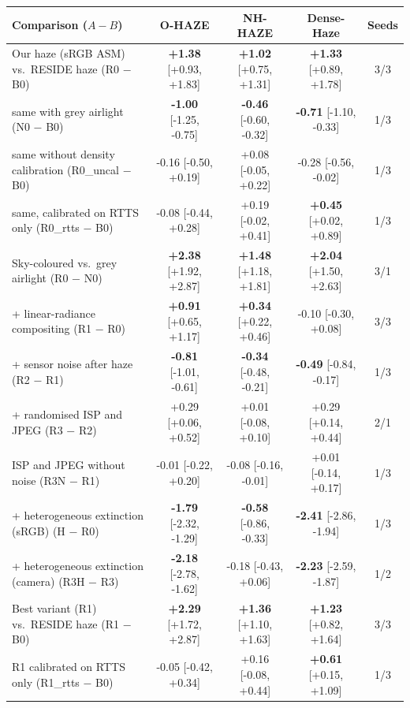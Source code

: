 \begin{tabular}{lcccc}
\toprule
Comparison ($A - B$) & O-HAZE & NH-HAZE & Dense-Haze & Seeds \\
\midrule
Our haze (sRGB ASM) vs.\ RESIDE haze (R0 $-$ B0) & \textbf{+1.38} {\scriptsize[+0.93, +1.83]} & \textbf{+1.02} {\scriptsize[+0.75, +1.31]} & \textbf{+1.33} {\scriptsize[+0.89, +1.78]} & 3/3 \\
\quad same with grey airlight (N0 $-$ B0) & \textbf{-1.00} {\scriptsize[-1.25, -0.75]} & \textbf{-0.46} {\scriptsize[-0.60, -0.32]} & \textbf{-0.71} {\scriptsize[-1.10, -0.33]} & 1/3 \\
\quad same without density calibration (R0\_uncal $-$ B0) & -0.16 {\scriptsize[-0.50, +0.19]} & +0.08 {\scriptsize[-0.05, +0.22]} & -0.28 {\scriptsize[-0.56, -0.02]} & 1/3 \\
\quad same, calibrated on RTTS only (R0\_rtts $-$ B0) & -0.08 {\scriptsize[-0.44, +0.28]} & +0.19 {\scriptsize[-0.02, +0.41]} & \textbf{+0.45} {\scriptsize[+0.02, +0.89]} & 1/3 \\
\addlinespace
Sky-coloured vs.\ grey airlight (R0 $-$ N0) & \textbf{+2.38} {\scriptsize[+1.92, +2.87]} & \textbf{+1.48} {\scriptsize[+1.18, +1.81]} & \textbf{+2.04} {\scriptsize[+1.50, +2.63]} & 3/1 \\
\addlinespace
+ linear-radiance compositing (R1 $-$ R0) & \textbf{+0.91} {\scriptsize[+0.65, +1.17]} & \textbf{+0.34} {\scriptsize[+0.22, +0.46]} & -0.10 {\scriptsize[-0.30, +0.08]} & 3/3 \\
+ sensor noise after haze (R2 $-$ R1) & \textbf{-0.81} {\scriptsize[-1.01, -0.61]} & \textbf{-0.34} {\scriptsize[-0.48, -0.21]} & \textbf{-0.49} {\scriptsize[-0.84, -0.17]} & 1/3 \\
+ randomised ISP and JPEG (R3 $-$ R2) & +0.29 {\scriptsize[+0.06, +0.52]} & +0.01 {\scriptsize[-0.08, +0.10]} & +0.29 {\scriptsize[+0.14, +0.44]} & 2/1 \\
ISP and JPEG without noise (R3N $-$ R1) & -0.01 {\scriptsize[-0.22, +0.20]} & -0.08 {\scriptsize[-0.16, -0.01]} & +0.01 {\scriptsize[-0.14, +0.17]} & 1/3 \\
\addlinespace
+ heterogeneous extinction (sRGB) (H $-$ R0) & \textbf{-1.79} {\scriptsize[-2.32, -1.29]} & \textbf{-0.58} {\scriptsize[-0.86, -0.33]} & \textbf{-2.41} {\scriptsize[-2.86, -1.94]} & 1/3 \\
+ heterogeneous extinction (camera) (R3H $-$ R3) & \textbf{-2.18} {\scriptsize[-2.78, -1.62]} & -0.18 {\scriptsize[-0.43, +0.06]} & \textbf{-2.23} {\scriptsize[-2.59, -1.87]} & 1/2 \\
\addlinespace
Best variant (R1) vs.\ RESIDE haze (R1 $-$ B0) & \textbf{+2.29} {\scriptsize[+1.72, +2.87]} & \textbf{+1.36} {\scriptsize[+1.10, +1.63]} & \textbf{+1.23} {\scriptsize[+0.82, +1.64]} & 3/3 \\
\quad R1 calibrated on RTTS only (R1\_rtts $-$ B0) & -0.05 {\scriptsize[-0.42, +0.34]} & +0.16 {\scriptsize[-0.08, +0.44]} & \textbf{+0.61} {\scriptsize[+0.15, +1.09]} & 1/3 \\
\bottomrule
\end{tabular}